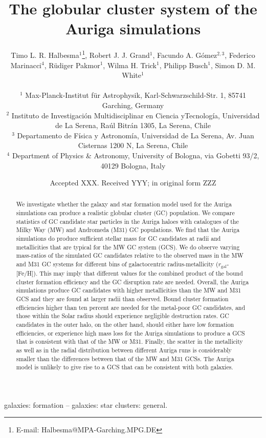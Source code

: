 \documentclass[a4paper,fleqn,usenatbib]{mnras}
\title[Auriga GCS]{The globular cluster system of the Auriga simulations}
\author[T. L. R. Halbesma et al.]{\parbox[t]{\textwidth}{
    Timo L. R. Halbesma$^{1}$\thanks{E-mail: Halbesma@MPA-Garching.MPG.DE},
    Robert J. J. Grand$^{1}$,
    Facundo A. G\'{o}mez$^{2,3}$,
    Federico Marinacci$^{4}$,
    R\"{u}diger Pakmor$^{1}$,
    Wilma H. Trick$^{1}$,
    Philipp Busch$^{1}$,
    Simon D. M. White$^{1}$
} \vspace{10pt} \\
$^{1}$ Max-Planck-Institut f\"ur Astrophysik, Karl-Schwarzschild-Str. 1,
    85741 Garching, Germany \\
$^{2}$ Instituto de Investigaci\'{o}n Multidisciplinar en Ciencia yTecnolog\'{i}a,
    Universidad de La Serena, Ra\'{u}l Bitr\'{a}n 1305, La Serena, Chile \\
$^{3}$ Departamento de F\'{i}sica y Astronom\'{i}a, Universidad de La Serena, Av.
    Juan Cisternas 1200 N, La Serena, Chile \\
$^{4}$ Department of Physics \& Astronomy, University of Bologna, via Gobetti 93/2, 40129 Bologna, Italy \\
}
\date{Accepted XXX. Received YYY; in original form ZZZ}
\begin{document}
\label{firstpage}
\pagerange{\pageref{firstpage}--\pageref{lastpage}}
\maketitle

\begin{abstract}
We investigate whether the galaxy and star formation model used for the Auriga
simulations can produce a realistic globular cluster (GC) population. 
We compare statistics of GC 
candidate star particles in the Auriga haloes with catalogues of the Milky Way 
(MW) and Andromeda (M31) GC populations. We find that the Auriga simulations do 
produce sufficient stellar mass for GC candidates at radii and metallicities that 
are typical for the MW GC system (GCS). We do observe varying mass-ratios of the
simulated GC candidates relative to the observed mass in the MW and M31 GC systems
for different bins of galactocentric radius-metallicity ($r_{\text{gal}}$-[Fe/H]).
This may imply that different values for the combined product of the bound cluster 
formation efficiency and the GC disruption rate are needed. Overall, the Auriga 
simulations produce GC candidates with higher metallicities than the MW and M31 
GCS and they are found at larger radii than observed. Bound cluster formation
efficiencies higher than ten percent are needed for the metal-poor GC candidates,
and those within the Solar radius should experience negligible destruction rates.
GC candidates in the outer halo, on the other hand, should either have low formation
efficiencies, or experience high mass loss for the Auriga simulations to produce a
GCS that is consistent with that of the MW or M31. Finally, the scatter in the 
metallicity as well as in the radial distribution between different Auriga runs 
is considerably smaller than the differences between that of the MW and M31 GCSs. 
The Auriga model is unlikely to give rise to a GCS that can be consistent with
both galaxies.
\end{abstract}

\begin{keywords}
galaxies: formation -- galaxies: star clusters: general.
\end{keywords}


\end{document}
